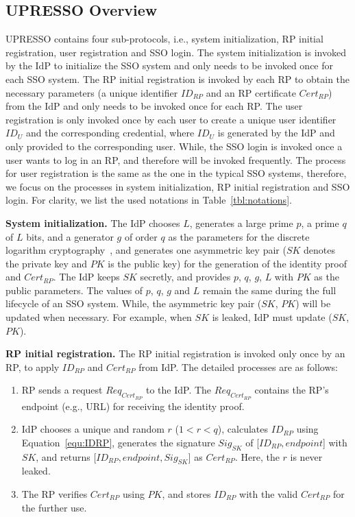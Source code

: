 \subsection{UPRESSO Overview}
\label{implementations}
UPRESSO contains four sub-protocols, i.e., system initialization, RP initial registration, user registration and SSO login.
The system initialization is invoked by the IdP to initialize the SSO system and only needs to be invoked once for each SSO system.
The RP initial registration is invoked by each RP to obtain the necessary parameters (a unique identifier $ID_{RP}$ and an RP certificate $Cert_{RP}$) from the IdP and only needs to be invoked once for each RP.
The user registration is only invoked once by each user to create a unique user identifier $ID_U$ and the corresponding credential,
where $ID_U$ is generated by the IdP and only provided to the corresponding user.
While, the SSO login is invoked once a user wants to log in an RP, and therefore will be invoked frequently.
The process for user registration is the same as the one in the typical SSO systems,
therefore, we focus on the processes in  system initialization, RP initial registration and SSO login.
For clarity, we list the used notations  in Table~\ref{tbl:notations}.

\vspace{1mm}\noindent \textbf{System initialization.} The IdP chooses $L$, generates a large prime $p$, a prime $q$ of $L$ bits, and a generator $g$ of order $q$ as  the parameters for the discrete logarithm cryptography~\cite{gallagher2013digital}, and generates one asymmetric key pair ($SK$ denotes the private key and $PK$ is the public key) for the generation of the identity proof and $Cert_{RP}$.
The IdP keeps $SK$ secretly, and provides $p$, $q$, $g$, $L$ with $PK$ as the public parameters.
The values of $p$, $q$, $g$ and $L$ remain the same during the full lifecycle of an SSO system.
While, the asymmetric key pair ($SK$, $PK$) will be updated when necessary. For example, when $SK$ is leaked, IdP must update ($SK$,$PK$).

\vspace{1mm}\noindent\textbf{RP initial registration.}
The RP initial registration is invoked only once by an RP, to apply $ID_{RP}$ and $Cert_{RP}$ from IdP.
The detailed processes are as follows:
\begin{enumerate}
\item RP sends a request $Req_{Cert_{RP}}$ to the IdP. The $Req_{Cert_{RP}}$ contains the RP's endpoint (e.g., URL) for receiving the identity proof.
\item IdP chooses a unique and random $r$ ($1 < r < q$),  calculates $ID_{RP}$ using Equation~\ref{equ:IDRP},  generates the signature $Sig_{SK}$ of [$ID_{RP}, endpoint$] with $SK$, and returns [$ID_{RP}, endpoint, Sig_{SK}$] as $Cert_{RP}$. Here, the $r$ is never leaked.
\item The RP  verifies $Cert_{RP}$ using $PK$,  and stores $ID_{RP}$ with the valid $Cert_{RP}$ for the further use.
\end{enumerate}

